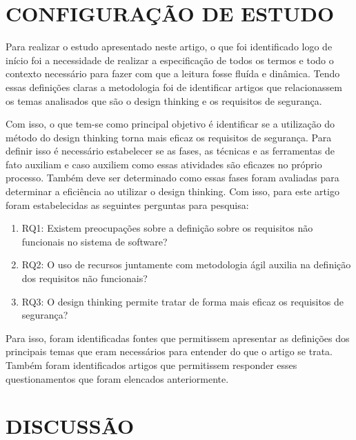 \documentclass[a4paper,twoside]{article}
\begin{document}
\section{\uppercase{Configuração de Estudo}}


Para realizar o estudo apresentado neste artigo, o que foi identificado logo de início foi a necessidade de realizar a especificação de todos os termos e todo o contexto necessário para fazer com que a leitura fosse fluída e dinâmica. Tendo essas definições claras a metodologia foi de identificar artigos que relacionassem os temas analisados que são o design thinking e os requisitos de segurança.

Com isso, o que tem-se como principal objetivo é identificar se a utilização do método do design thinking torna mais eficaz os requisitos de segurança. Para definir isso é necessário estabelecer se as fases, as técnicas e as ferramentas de fato auxiliam e caso auxiliem como essas atividades são eficazes no próprio processo. Também deve ser determinado como essas fases foram avaliadas para determinar a eficiência ao utilizar o design thinking. Com isso, para este artigo foram estabelecidas as seguintes perguntas para pesquisa:
\begin{enumerate}
    \item RQ1: Existem preocupações sobre a definição sobre os requisitos não funcionais no sistema de software?
    \item RQ2: O uso de recursos juntamente com  metodologia ágil auxilia na definição dos requisitos não funcionais?
    \item RQ3: O design thinking permite tratar de forma mais eficaz os requisitos de segurança?
\end{enumerate}

Para isso, foram identificadas fontes que permitissem apresentar as definições dos principais temas que eram necessários para entender do que o artigo se trata. Também foram identificados  artigos que permitissem responder esses questionamentos que foram elencados anteriormente.

\section{\uppercase{Discussão}}
\end{document}
